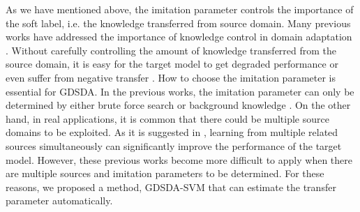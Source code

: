 As we have mentioned above, the imitation parameter controls the importance of the soft label, i.e. the knowledge transferred from source domain.
Many previous works have addressed the importance of knowledge control in domain adaptation \cite{duan2012learning,duan2012visual}. Without carefully controlling the amount of knowledge transferred from the source domain, it is easy for the target model to get degraded performance or even suffer from negative transfer \cite{pan2010survey}.
How to choose the imitation parameter is essential for GDSDA. In the previous works, the imitation parameter can only be determined by either brute force search \cite{lopez2015unifying} or background knowledge \cite{Tzeng_2015_ICCV}. On the other hand, in real applications, it is common that there could be multiple source domains to be exploited. As it is suggested in \cite{tommasi2014learning}, learning from multiple related sources simultaneously can significantly improve the performance of the target model. However, these previous works become more difficult to apply when there are multiple sources and imitation parameters to be determined.
For these reasons, we proposed a method, GDSDA-SVM that can estimate the transfer parameter automatically.



